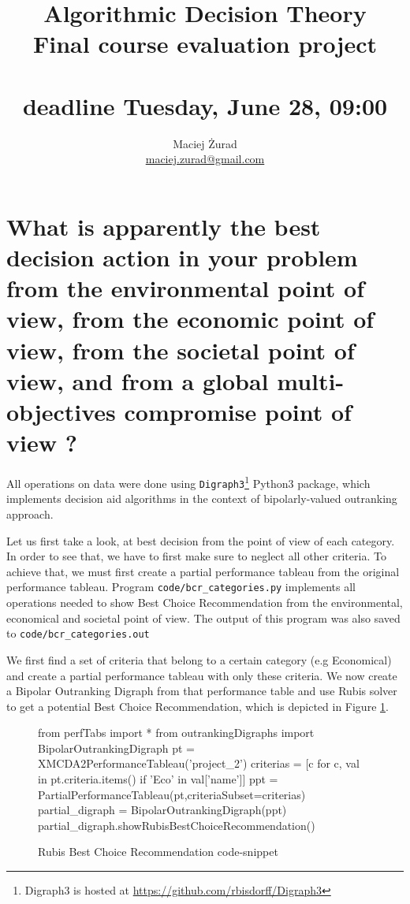 \documentclass[a4paper]{article}
\begin{document}
 \title{\textbf{Algorithmic Decision Theory} \\ Final course evaluation project
 \\  ~\\ \normalsize{deadline Tuesday, June 28, 09:00}}
 \author{Maciej Żurad \\ \url{maciej.zurad@gmail.com}}

\date{}

\maketitle



\section{What is apparently the best decision action in your problem from the environmental point of view, from the economic point of view, from the societal point of view, and from a global multi-objectives compromise point of view ?}

All operations on data were done using \texttt{Digraph3}\footnote{Digraph3 is hosted at \url{https://github.com/rbisdorff/Digraph3}} Python3 package, which implements decision aid algorithms in the context of bipolarly-valued outranking approach.

Let us first take a look, at best decision from the point of view of each category. In order to see that, we have to first make sure to neglect all other criteria. To achieve that, we must first create a partial performance tableau from the original performance tableau. Program \texttt{code/bcr\_categories.py} implements all operations needed to show Best Choice Recommendation from the environmental, economical and societal point of view. The output of this program was also saved to \texttt{code/bcr\_categories.out}

We first find a set of criteria that belong to a certain category (e.g Economical) and create a partial performance tableau with only these criteria. We now create a Bipolar Outranking Digraph from that performance table and use Rubis\cite{bisdorff2008r, bisdorff2006choices} solver to get a potential Best Choice Recommendation, which is depicted in Figure \ref{lst:rubis}.

\begin{figure}[H]
\begin{center}
\begin{python}
from perfTabs import *
from outrankingDigraphs import BipolarOutrankingDigraph
pt = XMCDA2PerformanceTableau('project_2')
criterias = [c for c, val in pt.criteria.items() if 'Eco' in val['name']]
ppt = PartialPerformanceTableau(pt,criteriaSubset=criterias)
partial_digraph = BipolarOutrankingDigraph(ppt)
partial_digraph.showRubisBestChoiceRecommendation()
\end{python}
\end{center}
\caption{Rubis Best Choice Recommendation code-snippet}
\label{lst:rubis}
\end{figure}
\end{document}
